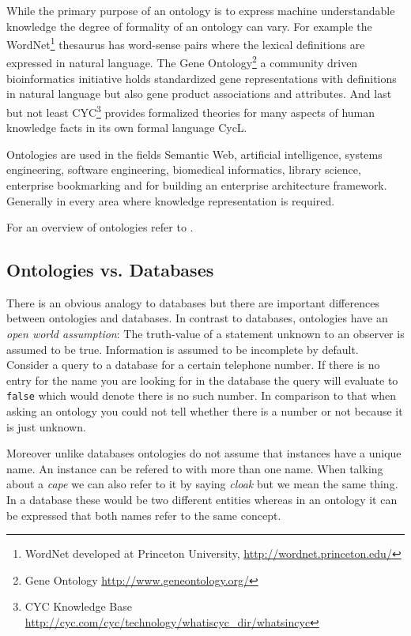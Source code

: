 While the primary purpose of an ontology is to express machine understandable knowledge the
degree of formality of an ontology can vary. For example the WordNet\footnote{WordNet developed
at Princeton University, \url{http://wordnet.princeton.edu/}} thesaurus has word-sense
pairs where the lexical definitions are expressed in natural language. The Gene Ontology\footnote{Gene
 Ontology \url{http://www.geneontology.org/}} a community driven bioinformatics
 initiative holds standardized gene representations with definitions in natural language but also gene product
associations and attributes. And last but not least  CYC\footnote{CYC Knowledge Base
\url{http://cyc.com/cyc/technology/whatiscyc_dir/whatsincyc}} provides formalized theories for many
aspects of human knowledge facts in its own formal language CycL.

Ontologies are used in the fields Semantic Web, artificial intelligence,
systems engineering, software engineering, biomedical informatics, library science, enterprise bookmarking and for building an
enterprise architecture framework. Generally in every area where knowledge representation is required.

For an overview of ontologies refer to \cite{horrocks2008}.

\subsection{Ontologies vs. Databases}
There is an obvious analogy to databases but there are important differences
between ontologies and databases.
In contrast to databases, ontologies have an \emph{open world assumption}:
The truth-value of a statement unknown to an observer is assumed to be true.
Information is assumed to be incomplete by default. Consider a query to
a database for a certain telephone number. If there is no entry for the
name you are looking for in the database the query will evaluate to \verb$false$
which would denote there is no such number. In comparison to that when
asking an ontology you could not tell whether there is a number or not
because it is just unknown.

Moreover unlike databases ontologies do not assume that instances have
a unique name. An instance can be refered to with more than one name.
When talking about a \emph{cape} we can also refer to it by saying \emph{cloak} but we
mean the same thing. In a database these would be two different entities
whereas in an ontology it can be expressed that both names refer to the
same concept.

